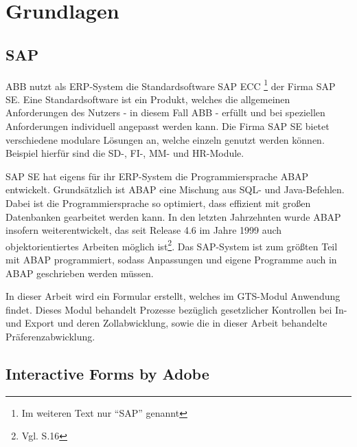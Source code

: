 
\chapter{Grundlagen}
\label{ch:Grundlagen}



\section{SAP}

ABB nutzt als \ac{ERP}-System die Standardsoftware SAP ECC \footnote{Im weiteren Text nur "`SAP"' genannt} der Firma SAP SE. Eine Standardsoftware ist ein Produkt, welches die allgemeinen Anforderungen des Nutzers - in diesem Fall \ac{ABB} - erfüllt und bei speziellen Anforderungen individuell angepasst werden kann. Die Firma SAP SE bietet verschiedene modulare Lösungen an, welche einzeln genutzt werden können. Beispiel hierfür sind die \ac{SD}-, \ac{FI}-, \ac{MM}- und \ac{HR}-Module. 

SAP SE hat eigens für ihr \ac{ERP}-System die Programmiersprache \ac{ABAP} entwickelt. Grundsätzlich ist \ac{ABAP} eine Mischung aus \ac{SQL}- und Java-Befehlen. Dabei ist  die Programmiersprache so optimiert, dass effizient mit großen Datenbanken gearbeitet werden kann. In den letzten Jahrzehnten wurde \ac{ABAP} insofern weiterentwickelt, das  seit Release 4.6 im Jahre 1999 auch objektorientiertes Arbeiten möglich ist\footnote{Vgl. \cite{Keller.2001} S.16}. Das SAP-System  ist zum größten Teil mit \ac{ABAP} programmiert, sodass Anpassungen und eigene Programme auch in \ac{ABAP} geschrieben werden müssen. 

In dieser Arbeit wird ein Formular erstellt, welches im \ac{GTS}-Modul Anwendung findet. Dieses Modul behandelt Prozesse bezüglich gesetzlicher Kontrollen bei In- und Export und deren Zollabwicklung, sowie die in dieser Arbeit behandelte Präferenzabwicklung.




\section{Interactive Forms by Adobe}

